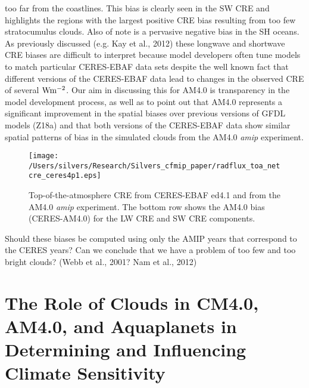 \documentclass[draft]{agujournal2019}
\begin{document}
too far from the coastlines. 
This bias is clearly seen in the SW CRE and highlights the regions with the largest
positive CRE bias resulting from too few stratocumulus clouds.  Also of note is a pervasive negative bias in the SH oceans.   
  As previously discussed (e.g. Kay et al., 2012) these longwave and shortwave CRE 
biases are difficult to interpret because model developers often tune models to match particular CERES-EBAF data 
sets despite the well known fact that different versions of the CERES-EBAF data lead to changes in the observed CRE of
several $\rm{W m^{-2}}$.   Our aim in discussing this for AM4.0 is transparency in the model development process, 
as well as to point out that AM4.0 represents a significant improvement in the spatial biases over previous versions
of GFDL models (Z18a) and that both versions of the CERES-EBAF data show similar spatial patterns of bias in the 
simulated clouds  from the AM4.0 \textit{amip} experiment.   

\begin{figure}
  \centering
  \texttt{[image: /Users/silvers/Research/Silvers\_cfmip\_paper/radflux\_toa\_netcre\_ceres4p1.eps]}
  \caption{Top-of-the-atmosphere CRE from CERES-EBAF ed4.1 and from the AM4.0 \textit{amip} experiment.  
  The bottom row shows the AM4.0 bias (CERES-AM4.0) for the LW CRE and SW CRE components.}
  \label{fig:ceres_cre_4p1}
\end{figure}

Should these biases be computed using only the AMIP years that 
correspond to the CERES years? 
Can we conclude that we have a problem of too few and too bright clouds?   (Webb et al., 2001? Nam et al., 2012)



\section{The Role of Clouds in CM4.0, AM4.0, and Aquaplanets in Determining and Influencing Climate Sensitivity}

\end{document}
